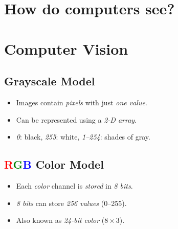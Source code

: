 \documentclass[
	number={9},
	title={Convolutional Neural Network}
]{cs584notes}
\begin{document}
\section{How do computers see?}\label{sec:how-do-computers-see?}

\section{Computer Vision}\label{sec:computer-vision}

\subsection{Grayscale Model}\label{subsec:grayscale-model}
\begin{itemize}
	\item Images contain \emph{pixels} with just \emph{one value}.
	\item Can be represented using a \emph{2-D array}.
	\item \emph{0}: black, \emph{255}: white, \emph{1--254}: shades of gray.
\end{itemize}

\subsection{\textcolor{red}{R}\textcolor{green}{G}\textcolor{blue}{B} Color Model}\label{subsec:rgb-color-model}
\begin{itemize}
	\item Each \emph{color} channel is \emph{stored} in \emph{8 bits}.
	\item \emph{8 bits} can store \emph{256 values} (0--255).
	\item Also known as \emph{24-bit color} ($8 \times 3$).
\end{itemize}
\end{document}
